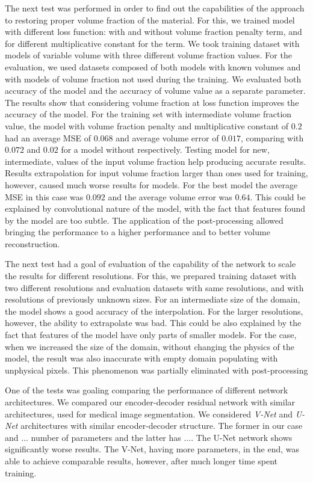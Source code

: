 The next test was performed in order to find out the capabilities of the approach to restoring proper volume fraction of the material. 
For this, we trained model with different loss function: with and without volume fraction penalty term, and for different multiplicative constant for the term.
We took training dataset with models of variable volume with three different volume fraction values.
For the evaluation, we used datasets composed of both models with known volumes and with models of volume fraction not used during the training.
We evaluated both accuracy of the model and the accuracy of volume value as a separate parameter.
The results show that considering volume fraction at loss function improves the accuracy of the model. 
For the training set with intermediate volume fraction value, the model with volume fraction penalty and multiplicative constant of $0.2$ had an average MSE of $0.068$ and average volume error of $0.017$, comparing with $0.072$ and $0.02$ for a model without respectively.
Testing model for new, intermediate, values of the input volume fraction help producing accurate results.
Results extrapolation for input volume fraction larger than ones used for training, however, caused much worse results for models. 
For the best model the average MSE in this case was $0.092$ and the average volume error was $0.64$.
This could be explained by convolutional nature of the model, with the fact that features found by the model are too subtle.  
The application of the post-processing allowed bringing the performance to a higher performance and to better volume reconstruction. 
\medskip 

The next test had a goal of evaluation of the capability of the network to scale the results for different resolutions.
For this, we prepared training dataset with two different resolutions and evaluation datasets with same resolutions, and with resolutions of previously unknown sizes.
For an intermediate size of the domain, the model shows a good accuracy of the interpolation.
For the larger resolutions, however, the ability to extrapolate was bad.
This could be also explained by the fact that features of the model have only parts of smaller models.
For the case, when we increased the size of the domain, without changing the physics of the model, the result was also inaccurate with empty domain populating with unphysical pixels.
This phenomenon was partially eliminated with post-processing
\medskip

One of the tests was goaling comparing the performance of different network architectures.
We compared our encoder-decoder residual network with similar architectures, used for medical image segmentation.
We considered \emph{V-Net}\cite{} and \emph{U-Net}\cite{} architectures with similar encoder-decoder structure.
The former in our case and $...$ number of parameters and the latter has $...$.
The U-Net network shows significantly worse results.
The V-Net, having more parameters, in the end, was able to achieve comparable results, however, after much longer time spent training.
\medskip

